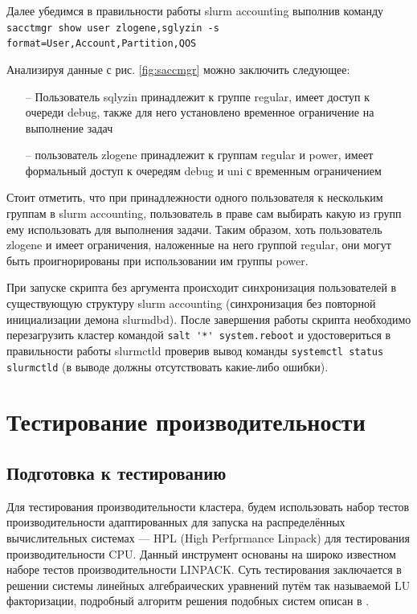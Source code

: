\documentclass[a4paper]{extarticle}
\begin{document}
Далее убедимся в правильности работы slurm accounting выполнив команду  \\ \verb|sacctmgr show user zlogene,sglyzin -s format=User,Account,Partition,QOS|

\bigskip

Анализируя данные с рис. \ref{fig:saccmgr} можно заключить следующее:

\begin{itemize}
\item[--] Пользователь sqlyzin принадлежит к группе regular, имеет доступ к очереди debug, также для него установлено временное ограничение на выполнение задач
\item[--] пользователь zlogene принадлежит к группам regular и power, имеет формальный доступ к очередям debug и uni с временным ограничением
\end{itemize}

Стоит отметить, что при принадлежности одного пользователя к нескольким группам в slurm accounting, пользователь в праве сам выбирать какую из групп ему использовать для выполнения задачи. Таким образом, хоть пользователь zlogene и имеет ограничения, наложенные на него группой regular, они могут быть проигнорированы при использовании им группы power.

При запуске скрипта без аргумента происходит синхронизация пользователей в существующую структуру slurm accounting (синхронизация без повторной инициализации демона slurmdbd). После завершения работы скрипта необходимо перезагрузить кластер командой \verb|salt '*' system.reboot| и удостовериться в правильности работы slurmctld проверив вывод команды \verb|systemctl status slurmctld| (в выводе должны отсутствовать какие-либо ошибки).

\newpage

\section{Тестирование производительности}

\setcounter{figure}{0}

\subsection{Подготовка к тестированию}

Для тестирования производительности кластера, будем использовать набор тестов производительности адаптированных для запуска на распределённых вычислительных системах --- HPL (High Perfprmance Linpack) для тестирования производительности CPU. Данный инструмент основаны на широко известном наборе тестов производительности LINPACK. Суть тестирования заключается в решении системы линейных алгебраических уравнений путём так называемой LU факторизации, подробный алгоритм решения подобных систем описан в \cite{linpack}.
\end{document}
